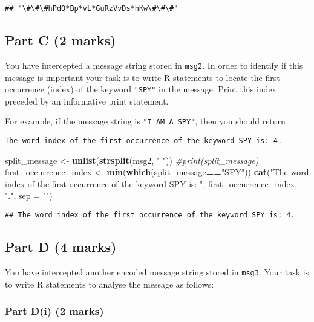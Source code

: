 \documentclass[
]{article}
\newenvironment{Shaded}{\begin{snugshade}}{\end{snugshade}}
\newcommand{\AttributeTok}[1]{\textcolor[rgb]{0.13,0.29,0.53}{#1}}
\newcommand{\CommentTok}[1]{\textcolor[rgb]{0.56,0.35,0.01}{\textit{#1}}}
\newcommand{\FunctionTok}[1]{\textcolor[rgb]{0.13,0.29,0.53}{\textbf{#1}}}
\newcommand{\NormalTok}[1]{#1}
\newcommand{\OtherTok}[1]{\textcolor[rgb]{0.56,0.35,0.01}{#1}}
\newcommand{\SpecialCharTok}[1]{\textcolor[rgb]{0.81,0.36,0.00}{\textbf{#1}}}
\newcommand{\StringTok}[1]{\textcolor[rgb]{0.31,0.60,0.02}{#1}}
\begin{document}
\begin{verbatim}
## "\#\#\#hPdQ*Bp*vL*GuRzVvDs*hKw\#\#\#"
\end{verbatim}

\subsection{Part C (2 marks)}\label{part-c-2-marks}

You have intercepted a message string stored in \texttt{msg2}. In order
to identify if this message is important your task is to write R
statements to locate the first occurrence (index) of the keyword
\texttt{"SPY"} in the message. Print this index preceded by an
informative print statement.

For example, if the message string is \texttt{"I\ AM\ A\ SPY"}, then you
should return

\texttt{The\ word\ index\ of\ the\ first\ occurrence\ of\ the\ keyword\ SPY\ is:\ 4.}

\begin{Shaded}
\begin{Highlighting}[]
\NormalTok{split\_message }\OtherTok{\textless{}{-}} \FunctionTok{unlist}\NormalTok{(}\FunctionTok{strsplit}\NormalTok{(msg2, }\StringTok{" "}\NormalTok{))}
\CommentTok{\#print(split\_message)}
\NormalTok{first\_occurrence\_index }\OtherTok{\textless{}{-}} \FunctionTok{min}\NormalTok{(}\FunctionTok{which}\NormalTok{(split\_message}\SpecialCharTok{==}\StringTok{"SPY"}\NormalTok{))}
\FunctionTok{cat}\NormalTok{(}\StringTok{"The word index of the first occurrence of the keyword SPY is: "}\NormalTok{, first\_occurrence\_index, }\StringTok{"."}\NormalTok{, }\AttributeTok{sep =} \StringTok{""}\NormalTok{)}
\end{Highlighting}
\end{Shaded}

\begin{verbatim}
## The word index of the first occurrence of the keyword SPY is: 4.
\end{verbatim}

\subsection{Part D (4 marks)}\label{part-d-4-marks}

You have intercepted another encoded message string stored in
\texttt{msg3}. Your task is to write R statements to analyse the message
as follows:

\subsubsection{Part D(i) (2 marks)}\label{part-di-2-marks}
\end{document}
